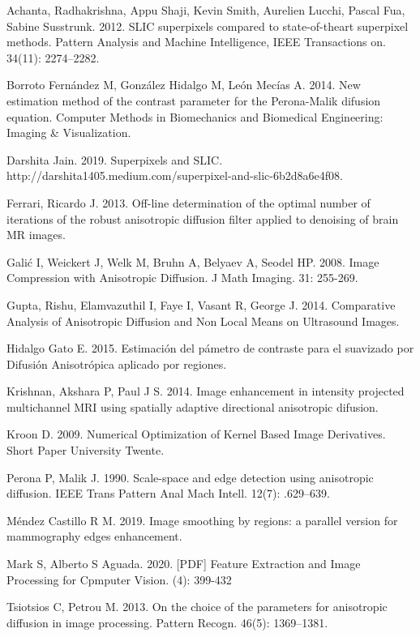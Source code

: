 \documentclass[a4paper,10pt,twocolumn]{article}
\begin{document}
\begin{thebibliography}{99}
	 Achanta, Radhakrishna, Appu Shaji, Kevin Smith, Aurelien Lucchi, Pascal Fua, Sabine Susstrunk. 2012. SLIC superpixels compared to state-of-theart superpixel methods. Pattern Analysis and Machine Intelligence, IEEE Transactions on. 34(11): 2274–2282.
	
	 Borroto Fern\'andez M, Gonz\'alez Hidalgo M, Le\'on Mec\'ias A. 2014. New estimation method of the contrast parameter for the Perona-Malik difusion equation. Computer Methods in Biomechanics and Biomedical Engineering: Imaging \& Visualization.
	
	 Darshita Jain. 2019. Superpixels and SLIC. http://darshita1405.medium.com/superpixel-and-slic-6b2d8a6e4f08.
	
	 Ferrari, Ricardo J. 2013. Off-line determination of the optimal number of iterations of the robust anisotropic diffusion filter applied to denoising of brain MR images.
	
	 Gali\'c I, Weickert J, Welk M, Bruhn A, Belyaev A, Seodel HP. 2008. Image Compression with Anisotropic Diffusion. J Math Imaging. 31: 255-269.
	
	 Gupta, Rishu, Elamvazuthil I, Faye I, Vasant R, George J. 2014. Comparative Analysis of Anisotropic Diffusion and Non Local Means on Ultrasound Images.
	
	 Hidalgo Gato E. 2015. Estimaci\'on del p\'ametro de contraste para el suavizado por Difusi\'on Anisotr\'opica aplicado por regiones.
	
	 Krishnan, Akshara P, Paul J S. 2014. Image enhancement in intensity projected multichannel MRI using spatially adaptive directional anisotropic difusion.
	
	 Kroon D. 2009. Numerical Optimization of Kernel Based Image Derivatives. Short Paper University Twente.
	
	 Perona P, Malik J. 1990. Scale-space and edge detection using anisotropic diffusion. IEEE Trans Pattern Anal Mach Intell. 12(7): .629–639.
	
	 M\'endez Castillo R M. 2019. Image smoothing by regions: a parallel version for mammography edges enhancement.
	
	 Mark S, Alberto S Aguada. 2020. [PDF] Feature Extraction and Image Processing for Cpmputer Vision. (4): 399-432
	
	 Tsiotsios C, Petrou M. 2013. On the choice of the parameters for anisotropic diffusion in image processing. Pattern Recogn. 46(5): 1369–1381.
\end{thebibliography}


\label{end}
\end{document}
